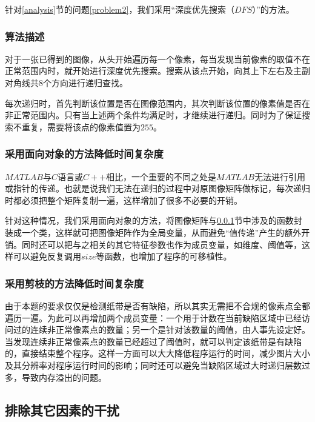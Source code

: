 \documentclass[UTF8]{ctexart}
\begin{document}
			\indent 针对\ref{analysis}节的问题\ref{problem2}，我们采用“深度优先搜索（$DFS$）”的方法。
			
			\subsubsection{算法描述}\label{algorithm}
			
				\indent 对于一张已得到的图像，从头开始遍历每一个像素，每当发现当前像素的取值不在正常范围内时，就开始进行深度优先搜索。搜索从该点开始，向其上下左右及主副对角线共$8$个方向进行递归查找。
				
				\indent 每次递归时，首先判断该位置是否在图像范围内，其次判断该位置的像素值是否在非正常范围内。只有当上述两个条件均满足时，才继续进行递归。同时为了保证搜索不重复，需要将该点的像素值置为$255$。
				
			\subsubsection{采用面向对象的方法降低时间复杂度}
			
				\indent $MATLAB$与$C$语言或$C++$相比，一个重要的不同之处是$MATLAB$无法进行引用或指针的传递。也就是说我们无法在递归的过程中对原图像矩阵做标记，每次递归时都必须把整个矩阵复制一遍，这样增加了很多不必要的开销。
				
				\indent 针对这种情况，我们采用面向对象的方法，将图像矩阵与\ref{algorithm}节中涉及的函数封装成一个类，这样就可把图像矩阵作为全局变量，从而避免“值传递”产生的额外开销。同时还可以把与之相关的其它特征参数也作为成员变量，如维度、阈值等，这样可以避免反复调用$size$等函数，也增加了程序的可移植性。
				
			\subsubsection{采用剪枝的方法降低时间复杂度}
				
				\indent 由于本题的要求仅仅是检测纸带是否有缺陷，所以其实无需把不合规的像素点全都遍历一遍。为此可以再增加两个成员变量：一个用于计数在当前缺陷区域中已经访问过的连续非正常像素点的数量；另一个是针对该数量的阈值，由人事先设定好。当发现连续非正常像素点的数量已经超过了阈值时，就可以判定该纸带是有缺陷的，直接结束整个程序。这样一方面可以大大降低程序运行的时间，减少图片大小及其分辨率对程序运行时间的影响；同时还可以避免当缺陷区域过大时递归层数过多，导致内存溢出的问题。
				
		\subsection{排除其它因素的干扰}
			
\end{document}
